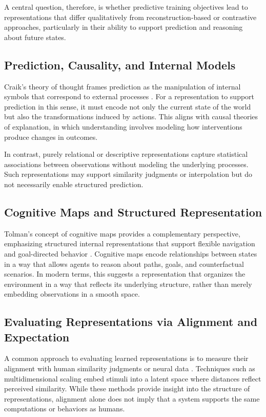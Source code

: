\documentclass[10pt,twocolumn]{article}
\begin{document}
A central question, therefore, is whether predictive training objectives lead to representations that differ qualitatively from reconstruction-based or contrastive approaches, particularly in their ability to support prediction and reasoning about future states.

\subsection{Prediction, Causality, and Internal Models}

Craik's theory of thought frames prediction as the manipulation of internal symbols that correspond to external processes \citep{craik1944nature}. For a representation to support prediction in this sense, it must encode not only the current state of the world but also the transformations induced by actions. This aligns with causal theories of explanation, in which understanding involves modeling how interventions produce changes in outcomes.

In contrast, purely relational or descriptive representations capture statistical associations between observations without modeling the underlying processes. Such representations may support similarity judgments or interpolation but do not necessarily enable structured prediction.

\subsection{Cognitive Maps and Structured Representation}

Tolman's concept of cognitive maps provides a complementary perspective, emphasizing structured internal representations that support flexible navigation and goal-directed behavior \citep{tolman1948cognitive}. Cognitive maps encode relationships between states in a way that allows agents to reason about paths, goals, and counterfactual scenarios. In modern terms, this suggests a representation that organizes the environment in a way that reflects its underlying structure, rather than merely embedding observations in a smooth space.

\subsection{Evaluating Representations via Alignment and Expectation}

A common approach to evaluating learned representations is to measure their alignment with human similarity judgments or neural data \citep{sucholutsky2023alignment, muttenthaler2023improving}. Techniques such as multidimensional scaling embed stimuli into a latent space where distances reflect perceived similarity. While these methods provide insight into the structure of representations, alignment alone does not imply that a system supports the same computations or behaviors as humans.
\end{document}
